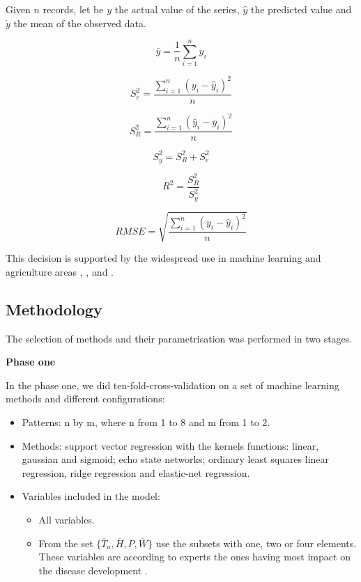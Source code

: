 \documentclass[review]{elsarticle}
\begin{document}
Given $n$ records, let be $y$ the actual value of the series, $\hat{y}$ the predicted value and $\acute{y}$ the mean of the observed data.

$$ \bar{y} = \frac{1}{n} \sum_{i=1}^{n} y_i $$

$$ S_e^2 = \frac{\sum_{i=1}^{n} {(y_i-\hat{y}_i)}^2 }{n}$$

$$ S_R^2 = \frac{\sum_{i=1}^{n} {(\hat{y}_i-\bar{y}_i)}^2 }{n}$$

$$ S_y^2 = S_R^2 + S_e^2$$

$$ R^2 = \frac{S_R^2}{S_y^2}$$

$$ RMSE = \sqrt{\frac{\sum_{i=1}^{n} {(y_i-\hat{y}_i)}^2 }{n}}$$
	
This decision is supported by the widespread use in machine learning and agriculture areas \citep{Soares2014}, \citep{Soares2013}, \citep{Ibrahim2014} and \citep{Demir2014}.  

\subsection{Methodology}
The selection of methods and their parametrisation was performed in two stages.

{\bf Phase one } 

In the phase one, we did ten-fold-cross-validation on a set of  machine learning methods and different configurations:

\begin{itemize}
\item 	Patterns: n by m, where n from 1 to 8 and m from 1 to 2.

\item Methods: support vector regression with the kernels functions: linear, gaussian and sigmoid; echo state networks; ordinary least squares linear regression, ridge regression and elastic-net regression.

\item Variables included in the model:
\begin{itemize}
\item All variables.
\item From the set $\{ \overline{T}_{a} , \overline{H}, P , \overline{W}  \}$ use the subsets with one, two or four elements. These variables are according to experts the ones having most impact on the disease development \citep{MarinVargas1995}.
\end{itemize}

\end{itemize}
\end{document}
